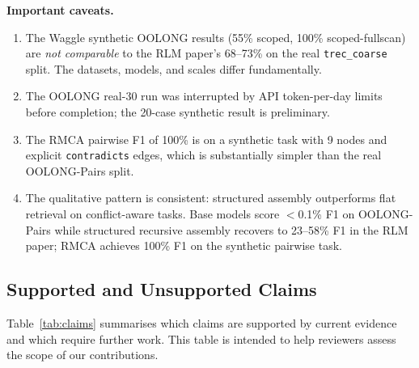 \documentclass[conference]{IEEEtran}
\begin{document}
\textbf{Important caveats.}
\begin{enumerate}
\item The Waggle synthetic OOLONG results (55\% scoped, 100\% scoped-fullscan) are
\emph{not comparable} to the RLM paper's 68--73\% on the real \texttt{trec\_coarse} split.
The datasets, models, and scales differ fundamentally.
\item The OOLONG real-30 run was interrupted by API token-per-day limits before completion;
the 20-case synthetic result is preliminary.
\item The RMCA pairwise F1 of 100\% is on a synthetic task with 9 nodes and explicit
\texttt{contradicts} edges, which is substantially simpler than the real OOLONG-Pairs split.
\item The qualitative pattern is consistent: structured assembly outperforms flat retrieval
on conflict-aware tasks. Base models score $<$0.1\% F1 on OOLONG-Pairs while structured
recursive assembly recovers to 23--58\% F1 in the RLM paper; RMCA achieves 100\% F1 on
the synthetic pairwise task.
\end{enumerate}


\subsection{Supported and Unsupported Claims}
\label{sec:claims}

Table~\ref{tab:claims} summarises which claims are supported by current evidence
and which require further work. This table is intended to help reviewers assess
the scope of our contributions.
\end{document}
